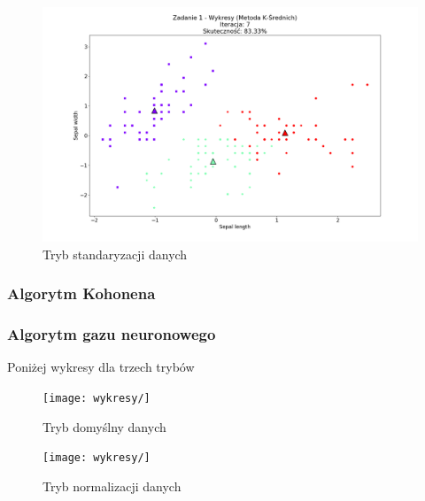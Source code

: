 \documentclass{classrep}
\begin{document}
{{{				\begin{figure}[!htbp]
					\includegraphics[width=\textwidth]{wykresy/plot_k_meansIrisStandadise.png}
					\caption{Tryb standaryzacji danych}
				\end{figure}
			\FloatBarrier
		}

		\subsubsection{Algorytm Kohonena}
		{ 
		}

		\subsubsection{Algorytm gazu neuronowego}
		{
			\iffalse
			Poniżej wykresy dla trzech trybów
				\begin{figure}[!htbp]
					\texttt{[image: wykresy/]}
					\caption{Tryb domyślny danych}
				\end{figure}
			
				\begin{figure}[!htbp]
					\texttt{[image: wykresy/]}
					\caption{Tryb normalizacji danych}
				\end{figure}
		
}}}
\end{document}
